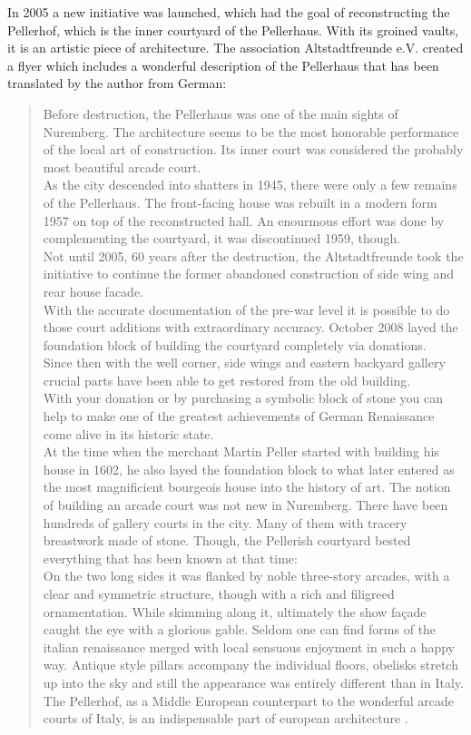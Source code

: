 In 2005 a new initiative was launched, which had the goal of reconstructing the Pellerhof, which is the inner courtyard of the Pellerhaus. With its groined vaults, it is an artistic piece of architecture. The association Altstadtfreunde e.V. created a flyer \parencite{afWiederaufbauDesPellerhofes} which includes a wonderful description of the Pellerhaus that has been translated by the author from German:

\blockquote{
	Before destruction, the Pellerhaus was one of the main sights of Nuremberg. The architecture seems to be the most honorable performance of the local art of construction. Its inner court was considered the probably most beautiful arcade court.\\
	As the city descended into shatters in 1945, there were only a few remains of the Pellerhaus. The front-facing house was rebuilt in a modern form 1957 on top of the reconstructed hall. An enourmous effort was done by complementing the courtyard, it was discontinued 1959, though.\\
	Not until 2005, 60 years after the destruction, the Altstadtfreunde took the initiative to continue the former abandoned construction of side wing and rear house facade.\\
	With the accurate documentation of the pre-war level it is possible to do those court additions with extraordinary accuracy. October 2008 layed the foundation block of building the courtyard completely via donations.\\
	Since then with the well corner, side wings and eastern backyard gallery crucial parts have been able to get restored from the old building.\\
	With your donation or by purchasing a symbolic block of stone you can help to make one of the greatest achievements of German Renaissance come alive in its historic state.\\
	At the time when the merchant Martin Peller started with building his house in 1602, he also layed the foundation block to what later entered as the most magnificient bourgeois house into the history of art. The notion of building an arcade court was not new in Nuremberg. There have been hundreds of gallery courts in the city. Many of them with tracery breastwork made of stone. Though, the Pellerish courtyard bested everything that has been known at that time:\\
	On the two long sides it was flanked by noble three-story arcades, with a clear and symmetric structure, though with a rich and filigreed ornamentation. While skimming along it, ultimately the show façade caught the eye with a glorious gable. Seldom one can find forms of the italian renaissance merged with local sensuous enjoyment in such a happy way. Antique style pillars accompany the individual floors, obelisks stretch up into the sky and still the appearance was entirely different than in Italy. The Pellerhof, as a Middle European counterpart to the wonderful arcade courts of Italy, is an indispensable part of european architecture .\\
}

